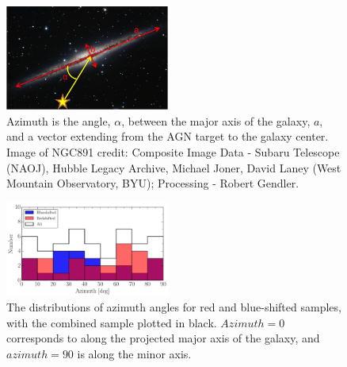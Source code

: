 \documentclass[iop]{emulateapj-rtx4}
\begin{document}
\begin{figure}[ht!]
        \centering
        \includegraphics[width=0.48\textwidth]{azimuth_illustration2.png}
        \caption{\small{Azimuth is the angle, $\alpha$, between the major axis of the galaxy, $a$, and a vector extending from the AGN target to the galaxy center. Image of NGC891 credit: Composite Image Data - Subaru Telescope (NAOJ), Hubble Legacy Archive, Michael Joner, David Laney (West Mountain Observatory, BYU); Processing - Robert Gendler.}}
        \label{azimuth_illustration}
        \vspace{5pt}
\end{figure} 

\begin{figure}[ht!]
        \centering
        \includegraphics[width=0.48\textwidth]{hist(azimuth)_overlaid_all.pdf}
        \caption{\small{The distributions of azimuth angles for red and blue-shifted samples, with the combined sample plotted in black. $Azimuth = 0$ corresponds to along the projected major axis of the galaxy, and $azimuth = 90$ is along the minor axis.}}
        \label{azimuth_dist}
        \vspace{5pt}
\end{figure}


\end{document}
